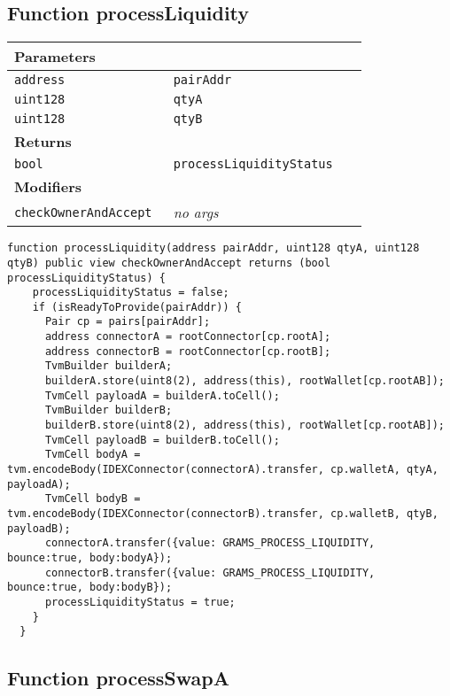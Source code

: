 \subsection{Function processLiquidity}


\ifsoltables
\noindent\begin{tabular}{|l|l|p{5cm}|}\hline
\multicolumn{3}{|l|}{\bf Parameters}\\\hline
\tt address & \tt pairAddr &\\\hline
\tt uint128 & \tt qtyA &\\\hline
\tt uint128 & \tt qtyB &\\\hline
\multicolumn{3}{|l|}{\bf Returns}\\\hline
\tt bool & \tt processLiquidityStatus &\\\hline
\multicolumn{3}{|l|}{\bf Modifiers}\\\hline
\tt checkOwnerAndAccept & {\em no args} &\\\hline
\end{tabular}
\fi



\begin{lstlisting}[firstnumber=251]
  function processLiquidity(address pairAddr, uint128 qtyA, uint128 qtyB) public view checkOwnerAndAccept returns (bool processLiquidityStatus) {
    processLiquidityStatus = false;
    if (isReadyToProvide(pairAddr)) {
      Pair cp = pairs[pairAddr];
      address connectorA = rootConnector[cp.rootA];
      address connectorB = rootConnector[cp.rootB];
      TvmBuilder builderA;
      builderA.store(uint8(2), address(this), rootWallet[cp.rootAB]);
      TvmCell payloadA = builderA.toCell();
      TvmBuilder builderB;
      builderB.store(uint8(2), address(this), rootWallet[cp.rootAB]);
      TvmCell payloadB = builderB.toCell();
      TvmCell bodyA = tvm.encodeBody(IDEXConnector(connectorA).transfer, cp.walletA, qtyA, payloadA);
      TvmCell bodyB = tvm.encodeBody(IDEXConnector(connectorB).transfer, cp.walletB, qtyB, payloadB);
      connectorA.transfer({value: GRAMS_PROCESS_LIQUIDITY, bounce:true, body:bodyA});
      connectorB.transfer({value: GRAMS_PROCESS_LIQUIDITY, bounce:true, body:bodyB});
      processLiquidityStatus = true;
    }
  }
\end{lstlisting}

\subsection{Function processSwapA}


